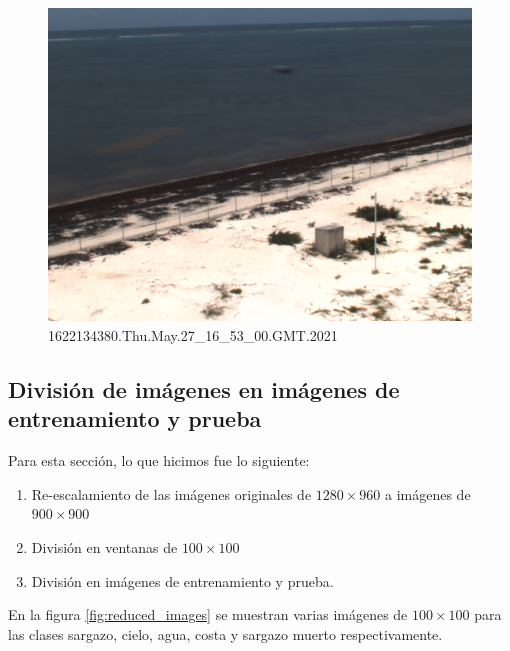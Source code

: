 \documentclass[conference]{IEEEtran}
\begin{document}
\begin{figure}[H]
    \centering
    \includegraphics[scale=0.13]{imgs/selected_img_1.png}
    \caption{1622134380.Thu.May.27\_16\_53\_00.GMT.2021}
\end{figure}


\subsection{División de imágenes en imágenes de entrenamiento y prueba}
Para esta sección, lo que hicimos fue lo siguiente:
\begin{enumerate}
    \item Re-escalamiento de las imágenes originales de $1280\times 960$ a imágenes de $900\times900$
    \item División en ventanas de $100\times 100$
    \item División en imágenes de entrenamiento y prueba.
\end{enumerate}

En la figura \ref{fig:reduced_images} se muestran varias imágenes de $100\times 100$ para las clases sargazo, cielo, agua, costa y sargazo muerto respectivamente. 
\end{document}
